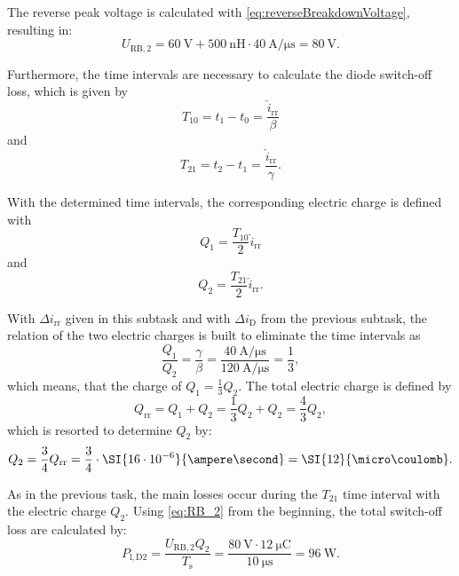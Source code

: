 \begin{solutionblock}
	The reverse peak voltage is calculated with \eqref{eq:reverseBreakdownVoltage}, resulting in:
	\begin{equation}
		U_{\mathrm{RB,2}} = \SI{60}{\volt} + \SI{500}{\nano\henry} \cdot \SI{40}{\ampere\per\micro\second} = \SI{80}{\volt}.
		\label{eq:RB_2}
	\end{equation}

	Furthermore, the time intervals are necessary to calculate the diode switch-off loss, which is given by
	\begin{equation}
		T_{10} = t_1 - t_0 = \frac{\hat{i}_{\mathrm{rr}}}{\beta}
	\end{equation}
	and
	\begin{equation}
		T_{21} = t_2 - t_1 = \frac{\hat{i}_{\mathrm{rr}}}{\gamma}.
	\end{equation}

	With the determined time intervals, the corresponding electric charge is defined with
	\begin{equation}
		Q_1 = \frac{T_{10}}{2}\hat{i}_{\mathrm{rr}}
	\end{equation}
	and
	\begin{equation}
		Q_2 = \frac{T_{21}}{2} \hat{i}_{\mathrm{rr}}.
	\end{equation}

	With $\Delta i_{\mathrm{rr}}$ given in this subtask and with $\Delta i_{\mathrm{D}}$ from the previous subtask, the relation of the two electric charges is built to eliminate the time intervals as
	\begin{equation}
		\frac{Q_{1}}{Q_{2}} = \frac{\gamma}{\beta}= \frac{\SI{40}{\ampere\per\micro\second}}{\SI{120}{\ampere\per\micro\second}}
		= \frac{1}{3},
	\end{equation}
	which means, that the charge of $Q_1 = \frac{1}{3} Q_2$.
	The total electric charge is defined by
	\begin{equation}
		Q_{\mathrm{rr}} = Q_1 + Q_2 = \frac{1}{3}Q_2 + Q_2 = \frac{4}{3}Q_2,
	\end{equation}
	which is resorted to determine $Q_2$ by:
	\begin{equation}
		Q_2 = \frac{3}{4}Q_{\mathrm{rr}} = \frac{3}{4}\cdot \SI{16\cdot10^{-6}}{\ampere\second}
		= \SI{12}{\micro\coulomb}.
	\end{equation}

	As in the previous task, the main losses occur during the $T_{21}$ time interval with the electric charge $Q_{2}$. Using \eqref{eq:RB_2} from the beginning, the total switch-off loss are calculated by:
	\begin{equation}
		P_{\mathrm{l,D2}} = \frac{U_{\mathrm{RB,2}}Q_2}{T_{\mathrm{s}}}
		= \frac{\SI{80}{\volt}\cdot\SI{12}{\micro\coulomb}}{\SI{10}{\micro\second}} = \SI{96}{\watt}.
	\end{equation}


\end{solutionblock}
